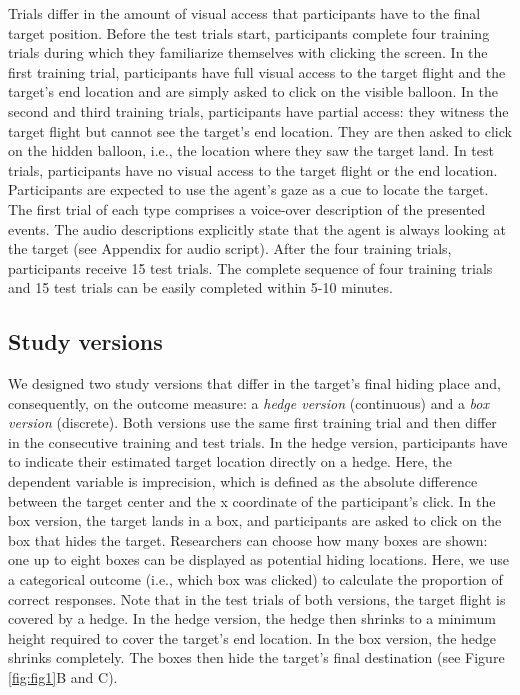 \documentclass[
  man,floatsintext]{apa6}
\begin{document}
Trials differ in the amount of visual access that participants have to the final target position.
Before the test trials start, participants complete four training trials during which they familiarize themselves with clicking the screen.
In the first training trial, participants have full visual access to the target flight and the target's end location and are simply asked to click on the visible balloon.
In the second and third training trials, participants have partial access: they witness the target flight but cannot see the target's end location.
They are then asked to click on the hidden balloon, i.e., the location where they saw the target land.
In test trials, participants have no visual access to the target flight or the end location.
Participants are expected to use the agent's gaze as a cue to locate the target.
The first trial of each type comprises a voice-over description of the presented events.
The audio descriptions explicitly state that the agent is always looking at the target (see Appendix for audio script).
After the four training trials, participants receive 15 test trials.
The complete sequence of four training trials and 15 test trials can be easily completed within 5-10 minutes.

\hypertarget{study-versions}{%
\subsection{Study versions}\label{study-versions}}

We designed two study versions that differ in the target's final hiding place and, consequently, on the outcome measure: a \emph{hedge version} (continuous) and a \emph{box version} (discrete).
Both versions use the same first training trial and then differ in the consecutive training and test trials.
In the hedge version, participants have to indicate their estimated target location directly on a hedge.
Here, the dependent variable is imprecision, which is defined as the absolute difference between the target center and the x coordinate of the participant's click.
In the box version, the target lands in a box, and participants are asked to click on the box that hides the target.
Researchers can choose how many boxes are shown: one up to eight boxes can be displayed as potential hiding locations.
Here, we use a categorical outcome (i.e., which box was clicked) to calculate the proportion of correct responses.
Note that in the test trials of both versions, the target flight is covered by a hedge.
In the hedge version, the hedge then shrinks to a minimum height required to cover the target's end location.
In the box version, the hedge shrinks completely.
The boxes then hide the target's final destination (see Figure \ref{fig:fig1}B and C).
\end{document}
